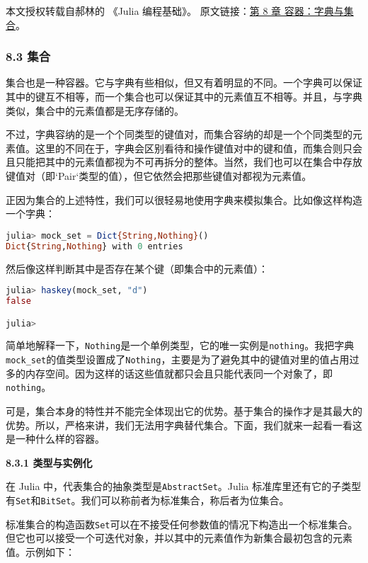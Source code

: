 
本文授权转载自郝林的 《Julia 编程基础》。 原文链接：\href{https://github.com/hyper0x/JuliaBasics/blob/master/book/ch08.md}{第 8 章 容器：字典与集合}。


\subsubsection{8.3 集合}

集合也是一种容器。它与字典有些相似，但又有着明显的不同。一个字典可以保证其中的键互不相等，而一个集合也可以保证其中的元素值互不相等。并且，与字典类似，集合中的元素值都是无序存储的。

不过，字典容纳的是一个个同类型的键值对，而集合容纳的却是一个个同类型的元素值。这里的不同在于，字典会区别看待和操作键值对中的键和值，而集合则只会且只能把其中的元素值都视为不可再拆分的整体。当然，我们也可以在集合中存放键值对（即`Pair`类型的值），但它依然会把那些键值对都视为元素值。

正因为集合的上述特性，我们可以很轻易地使用字典来模拟集合。比如像这样构造一个字典：

\begin{lstlisting}[language=julia]
julia> mock_set = Dict{String,Nothing}()
Dict{String,Nothing} with 0 entries
\end{lstlisting}

然后像这样判断其中是否存在某个键（即集合中的元素值）：

\begin{lstlisting}[language=julia]
julia> haskey(mock_set, "d")
false

julia> 
\end{lstlisting}

简单地解释一下，\verb|Nothing|是一个单例类型，它的唯一实例是\verb|nothing|。我把字典\verb|mock_set|的值类型设置成了\verb|Nothing|，主要是为了避免其中的键值对里的值占用过多的内存空间。因为这样的话这些值就都只会且只能代表同一个对象了，即\verb|nothing|。

可是，集合本身的特性并不能完全体现出它的优势。基于集合的操作才是其最大的优势。所以，严格来讲，我们无法用字典替代集合。下面，我们就来一起看一看这是一种什么样的容器。

\textbf{8.3.1 类型与实例化}

在 Julia 中，代表集合的抽象类型是\verb|AbstractSet|。Julia 标准库里还有它的子类型有\verb|Set|和\verb|BitSet|。我们可以称前者为标准集合，称后者为位集合。

标准集合的构造函数\verb|Set|可以在不接受任何参数值的情况下构造出一个标准集合。但它也可以接受一个可迭代对象，并以其中的元素值作为新集合最初包含的元素值。示例如下：

